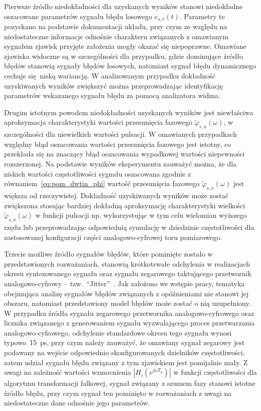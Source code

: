 Pierwsze źródło niedokładności dla uzyskanych wyników stanowi niedokładne oszacowane parametrów sygnału błędu losowego $e_{s,r}(t)$. Parametry te pozyskano na podstawie dokumentacji układu, przy czym ze względu na niedostateczne informacje odnośnie charakteru związanych z omawianym sygnałem zjawisk przyjęte założenia mogły okazać się niepoprawne. Omawiane zjawiska widoczne są w szczególności dla przypadku, gdzie dominujące źródło błędów stanowią sygnały błędów losowych, natomiast sygnał błędu dynamicznego cechuje się niską wariancją. W analizowanym przypadku dokładność uzyskiwanych wyników zwiększyć można przeprowadzając identyfikację parametrów wskazanego sygnału błędu za pomocą analizatora widma.

Drugim istotnym powodem niedokładności uzyskanych wyników jest niewłaściwa aproksymacja charakterystyki wartości przesunięcia fazowego $\tilde{\varphi}_{s,x}(\omega)$, w szczególności dla niewielkich wartości pulsacji. W omawianych przypadkach względny błąd oszacowania wartości przesunięcia fazowego jest istotny, co przekłada się na znaczący błąd oszacowania wypadkowej wartości niepewności rozszerzonej. Na podstawie wyników eksperymentu zauważyć można, że dla niskich wartości częstotliwości sygnału oszacowana zgodnie z równaniem~\eqref{eq:pom_dwtin_phi} wartość przesunięcia fazowego $\tilde{\varphi}_{s,x}(\omega)$ jest większa od rzeczywistej. Dokładność uzyskiwanych wyników może zostać zwiększona stosując bardziej dokładną aproksymację charakterystyki wielkości $\tilde{\varphi}_{s,x}(\omega)$ w funkcji pulsacji np. wykorzystując w tym celu wielomian wyższego rzędu lub przeprowadzając odpowiednią symulację w dziedzinie częstotliwości dla zastosowanej konfiguracji części analogowo-cyfrowej toru pomiarowego.

Trzecie możliwe źródło sygnałów błędów, które pominięte zostało w przedstawionych rozważaniach, stanowią krótkotrwałe odchylenia w realizacjach okresu syntezowanego sygnału oraz sygnału zegarowego taktującego przetwornik analogowo-cyfrowy -- tzw.~\enquote{Jitter}~\cite{renesans_jitter}. Jak założono we wstępie pracy, tematyka obejmująca analizę sygnałów błędów związanych z opóźnieniami nie stanowi jej obszaru, natomiast przedstawiony model błędów może zostać o nią uzupełniony. W przypadku źródła sygnału zegarowego przetwornika analogowo-cyfrowego oraz licznika związanego z generowaniem sygnału wyzwalającego proces przetwarzania analogowo-cyfrowego, odchylenie standardowe okresu tego sygnału wynosi typowo~\qty{15}{ps}, przy czym należy zauważyć, że omawiany sygnał zegarowy jest podawany na wejście odpowiednio skonfigurowanych dzielników częstotliwości, zatem udział sygnału błędu związany z tym zjawiskiem jest pomijalnie mały. Z uwagi na zależność wartości wzmocnienia $|H_{i}(e^{j \omega T_{p}})|$ w funkcji częstotliwości dla algorytmu transformacji falkowej, sygnał związany z szumem fazy stanowi istotne źródło błędu, przy czym sygnał ten pominięto w rozważaniach z uwagi na niedostateczne dane odnośnie jego parametrów.

